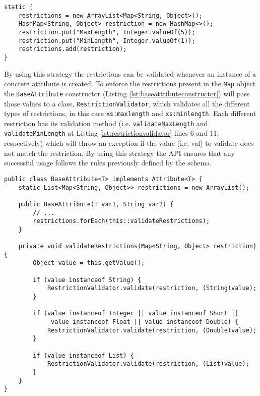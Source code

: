 
\begin{minipage}{\linewidth}
\begin{lstlisting}[caption={Attribute Static Constructor Restrictions},captionpos=b,label={lst:attrhardcodedrestrictions}]
static {
    restrictions = new ArrayList<Map<String, Object>();
    HashMap<String, Object> restriction = new HashMap<>();
    restriction.put("MaxLength", Integer.valueOf(5));
    restriction.put("MinLength", Integer.valueOf(1));
    restrictions.add(restriction);
}
\end{lstlisting}
\end{minipage}

\noindent
By using this strategy the restrictions can be validated whenever an instance of a concrete attribute is created. To enforce the restrictions present in the \texttt{Map} object the \texttt{BaseAttribute} constructor (Listing \ref{lst:baseattributeconstructor}) will pass those values to a class, \texttt{RestrictionValidator}, which validates all the different types of restrictions, in this case \texttt{xs:maxlength} and \texttt{xs:minlength}. Each different restriction has its validation method (i.e. \texttt{validateMaxLength} and \texttt{validateMinLength} at Listing \ref{lst:restrictionvalidator} lines 6 and 11, respectively) which will throw an exception if the value (i.e. val) to validate does not match the restriction. By using this strategy the \ac{API} ensures that any successful usage follows the rules previously defined by the schema.

\bigskip


\begin{minipage}{\linewidth}
\begin{lstlisting}[caption={BaseAttribute Rule Validation Restrictions},label={lst:baseattributeconstructor}]
public class BaseAttribute<T> implements Attribute<T> {
    static List<Map<String, Object>> restrictions = new ArrayList();

    public BaseAttribute(T var1, String var2) {
        // ...
        restrictions.forEach(this::validateRestrictions);
    }
    
    private void validateRestrictions(Map<String, Object> restriction){
        Object value = this.getValue();
        
        if (value instanceof String) {
            RestrictionValidator.validate(restriction, (String)value);
        }

        if (value instanceof Integer || value instanceof Short || 
             value instanceof Float || value instanceof Double) {
            RestrictionValidator.validate(restriction, (Double)value);
        }

        if (value instanceof List) {
            RestrictionValidator.validate(restriction, (List)value);
        }
    }
}
\end{lstlisting}
\end{minipage}

